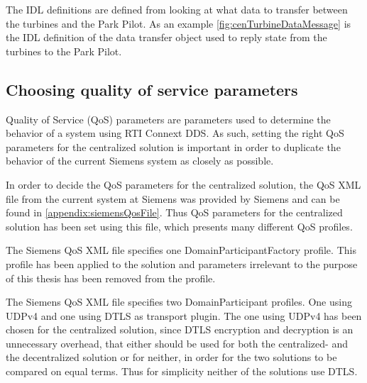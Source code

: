 The IDL definitions are defined from looking at what data to transfer between the turbines and the Park Pilot. As an example \cref{fig:cenTurbineDataMessage} is the IDL definition of the data transfer object used to reply state from the turbines to the Park Pilot.

%
%
%	
%

\subsection{Choosing quality of service parameters}\label{sec:choosingQosParams}

Quality of Service (QoS) parameters are parameters used to determine the behavior of a system using RTI Connext DDS. As such, setting the right QoS parameters for the centralized solution is important in order to duplicate the behavior of the current Siemens system as closely as possible. 

In order to decide the QoS parameters for the centralized solution, the QoS XML file from the current system at Siemens was provided by Siemens and can be found in \cref{appendix:siemensQosFile}. Thus QoS parameters for the centralized solution has been set using this file, which presents many different QoS profiles.

The Siemens QoS XML file specifies one DomainParticipantFactory profile. This profile has been applied to the solution and parameters irrelevant to the purpose of this thesis has been removed from the profile.

The Siemens QoS XML file specifies two DomainParticipant profiles. One using UDPv4 and one using DTLS as transport plugin. The one using UDPv4 has been chosen for the centralized solution, since DTLS encryption and decryption is an unnecessary overhead, that either should be used for both the centralized- and the decentralized solution or for neither, in order for the two solutions to be compared on equal terms. Thus for simplicity neither of the solutions use DTLS.


